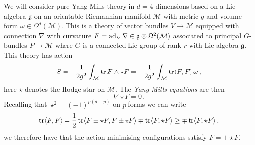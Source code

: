 \documentclass[main.tex]{subfiles}
\begin{document}
We will consider pure Yang-Mills theory in $d=4$ dimensions based on a Lie algebra $\mathfrak{g}$ on an orientable Riemannian manifold $\mathcal{M}$ with metric $g$ and volume form $\omega\in\Omega^d(\mathcal{M})$.  This is a theory of vector bundles $V\to \mathcal{M}$ equipped with connection $\nabla$ with curvature $F=\operatorname{ad}_{\nabla}\nabla\in\mathfrak{g}\otimes \Omega^2(\mathcal{M})$ associated to principal $G$-bundles $P\to \mathcal{M}$ where $G$ is a connected Lie group of rank $r$ with Lie algebra $\mathfrak{g}$.  This theory has action
\begin{equation}
S=-\frac{1}{2g^2}\int_{\mathcal{M}}\operatorname{tr} F\wedge \star F=-\frac{1}{2g^2}\int_{\mathcal{M}}\operatorname{tr} \langle F,F\rangle\, \omega\,,
\end{equation}
here $\star$ denotes the Hodge star on $\mathcal{M}$. The \textit{Yang-Mills equations} are then
\begin{equation}\label{eqn:YMequations}
\nabla \star F=0\,.
\end{equation}
Recalling that $\star^2=(-1)^{p(d-p)}$ on $p$-forms we can write
\begin{equation}
\operatorname{tr}\langle F,F\rangle=\frac{1}{2}\operatorname{tr}\langle F\pm\star F,F\pm\star F\rangle\mp\operatorname{tr}\langle F,\star F\rangle\geq \mp\operatorname{tr}\langle F,\star F\rangle\,,
\end{equation}
we therefore have that the action minimising configurations satisfy $F=\pm\star F$.
\end{document}
